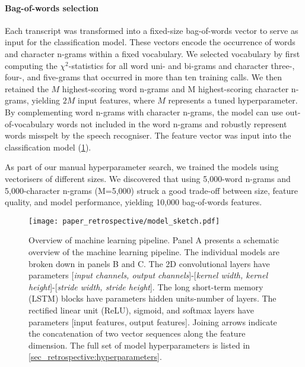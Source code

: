 {\begin{table}
{\begin{tabular}{l|l|l}
        \bottomrule
    \end{tabular}%
    \vspace{-2mm}
    }
\end{table}


\paragraph{Bag-of-words selection}

Each transcript was transformed into a fixed-size bag-of-words vector to serve as input for the classification model. These vectors encode the occurrence of words and character n-grams within a fixed vocabulary. We selected vocabulary by first computing the $\chi^2$-statistics for all word uni- and bi-grams and character three-, four-, and five-grams that occurred in more than ten training calls. We then retained the $M$ highest-scoring word n-grams and M highest-scoring character n-grams, yielding $2M$ input features, where $M$ represents a tuned hyperparameter. By complementing word n-grams with character n-grams, the model can use out-of-vocabulary words not included in the word n-grams and robustly represent words misspelt by the speech recogniser. The feature vector was input into the classification model (\cref{fig_retrospective:model_sketch}).

As part of our manual hyperparameter search, we trained the models using vectorisers of different sizes. We discovered that using 5,000-word n-grams and 5,000-character n-grams (M=5,000) struck a good trade-off between size, feature quality, and model performance, yielding 10,000 bag-of-words features.

\begin{figure}
    \centering
    \texttt{[image: paper\_retrospective/model\_sketch.pdf]}
    \caption[Overview of machine learning pipeline for stroke recognition.]{Overview of machine learning pipeline. Panel A presents a schematic overview of the machine learning pipeline. The individual models are broken down in panels B and C. The 2D convolutional layers have parameters [\textit{input channels, output channels}]-[\textit{kernel width, kernel height}]-[\textit{stride width, stride height}]. The long short-term memory (LSTM) blocks have parameters hidden units-number of layers. The rectified linear unit (ReLU), sigmoid, and softmax layers have parameters [input features, output features]. Joining arrows indicate the concatenation of two vector sequences along the feature dimension. The full set of model hyperparameters is listed in \cref{sec_retrospective:hyperparameters}.}
    \label{fig_retrospective:model_sketch}
\end{figure}

}
